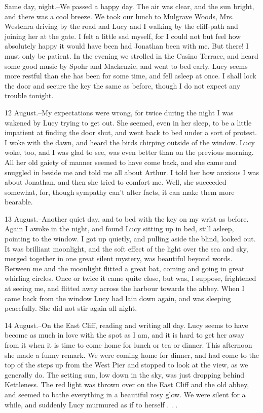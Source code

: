 Same day, night.--We passed a happy day. The air was clear, and the sun bright, and there was a cool breeze. We took our lunch to Mulgrave Woods, Mrs. Westenra driving by the road and Lucy and I walking by the cliff-path and joining her at the gate. I felt a little sad myself, for I could not but feel how absolutely happy it would have been had Jonathan been with me. But there! I must only be patient. In the evening we strolled in the Casino Terrace, and heard some good music by Spohr and Mackenzie, and went to bed early. Lucy seems more restful than she has been for some time, and fell asleep at once. I shall lock the door and secure the key the same as before, though I do not expect any trouble tonight. 

12 August.--My expectations were wrong, for twice during the night I was wakened by Lucy trying to get out. She seemed, even in her sleep, to be a little impatient at finding the door shut, and went back to bed under a sort of protest. I woke with the dawn, and heard the birds chirping outside of the window. Lucy woke, too, and I was glad to see, was even better than on the previous morning. All her old gaiety of manner seemed to have come back, and she came and snuggled in beside me and told me all about Arthur. I told her how anxious I was about Jonathan, and then she tried to comfort me. Well, she succeeded somewhat, for, though sympathy can't alter facts, it can make them more bearable. 

13 August.--Another quiet day, and to bed with the key on my wrist as before. Again I awoke in the night, and found Lucy sitting up in bed, still asleep, pointing to the window. I got up quietly, and pulling aside the blind, looked out. It was brilliant moonlight, and the soft effect of the light over the sea and sky, merged together in one great silent mystery, was beautiful beyond words. Between me and the moonlight flitted a great bat, coming and going in great whirling circles. Once or twice it came quite close, but was, I suppose, frightened at seeing me, and flitted away across the harbour towards the abbey. When I came back from the window Lucy had lain down again, and was sleeping peacefully. She did not stir again all night. 

14 August.--On the East Cliff, reading and writing all day. Lucy seems to have become as much in love with the spot as I am, and it is hard to get her away from it when it is time to come home for lunch or tea or dinner. This afternoon she made a funny remark. We were coming home for dinner, and had come to the top of the steps up from the West Pier and stopped to look at the view, as we generally do. The setting sun, low down in the sky, was just dropping behind Kettleness. The red light was thrown over on the East Cliff and the old abbey, and seemed to bathe everything in a beautiful rosy glow. We were silent for a while, and suddenly Lucy murmured as if to herself . . . 

